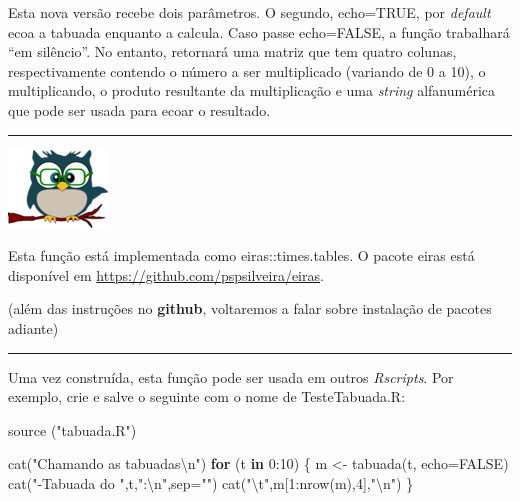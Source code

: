 \documentclass[
]{article}
\newenvironment{Shaded}{\begin{snugshade}}{\end{snugshade}}
\newcommand{\AttributeTok}[1]{\textcolor[rgb]{0.77,0.63,0.00}{#1}}
\newcommand{\ConstantTok}[1]{\textcolor[rgb]{0.00,0.00,0.00}{#1}}
\newcommand{\ControlFlowTok}[1]{\textcolor[rgb]{0.13,0.29,0.53}{\textbf{#1}}}
\newcommand{\DecValTok}[1]{\textcolor[rgb]{0.00,0.00,0.81}{#1}}
\newcommand{\FunctionTok}[1]{\textcolor[rgb]{0.00,0.00,0.00}{#1}}
\newcommand{\NormalTok}[1]{#1}
\newcommand{\OtherTok}[1]{\textcolor[rgb]{0.56,0.35,0.01}{#1}}
\newcommand{\SpecialCharTok}[1]{\textcolor[rgb]{0.00,0.00,0.00}{#1}}
\newcommand{\StringTok}[1]{\textcolor[rgb]{0.31,0.60,0.02}{#1}}
\begin{document}
Esta nova versão recebe dois parâmetros. O segundo, echo=TRUE, por
\emph{default} ecoa a tabuada enquanto a calcula. Caso passe echo=FALSE,
a função trabalhará ``em silêncio''. No entanto, retornará uma matriz
que tem quatro colunas, respectivamente contendo o número a ser
multiplicado (variando de 0 a 10), o multiplicando, o produto resultante
da multiplicação e uma \emph{string} alfanumérica que pode ser usada
para ecoar o resultado.

\begin{center}\rule{0.5\linewidth}{0.5pt}\end{center}

\begin{flushleft}\includegraphics[width=0.08\linewidth]{coruja} \end{flushleft}

Esta função está implementada como eiras::times.tables. O pacote eiras
está disponível em \url{https://github.com/pspsilveira/eiras}.

(além das instruções no \textbf{github}, voltaremos a falar sobre
instalação de pacotes adiante)

\begin{center}\rule{0.5\linewidth}{0.5pt}\end{center}

Uma vez construída, esta função pode ser usada em outros
\emph{Rscripts}. Por exemplo, crie e salve o seguinte com o nome de
TesteTabuada.R:

\begin{Shaded}
\begin{Highlighting}[]
\FunctionTok{source}\NormalTok{ (}\StringTok{"tabuada.R"}\NormalTok{)}

\FunctionTok{cat}\NormalTok{(}\StringTok{"Chamando as tabuadas}\SpecialCharTok{\textbackslash{}n}\StringTok{"}\NormalTok{)}
\ControlFlowTok{for}\NormalTok{ (t }\ControlFlowTok{in} \DecValTok{0}\SpecialCharTok{:}\DecValTok{10}\NormalTok{)}
\NormalTok{\{}
\NormalTok{  m }\OtherTok{\textless{}{-}} \FunctionTok{tabuada}\NormalTok{(t, }\AttributeTok{echo=}\ConstantTok{FALSE}\NormalTok{)}
  \FunctionTok{cat}\NormalTok{(}\StringTok{"{-}Tabuada do "}\NormalTok{,t,}\StringTok{":}\SpecialCharTok{\textbackslash{}n}\StringTok{"}\NormalTok{,}\AttributeTok{sep=}\StringTok{""}\NormalTok{)}
  \FunctionTok{cat}\NormalTok{(}\StringTok{"}\SpecialCharTok{\textbackslash{}t}\StringTok{"}\NormalTok{,m[}\DecValTok{1}\SpecialCharTok{:}\FunctionTok{nrow}\NormalTok{(m),}\DecValTok{4}\NormalTok{],}\StringTok{"}\SpecialCharTok{\textbackslash{}n}\StringTok{"}\NormalTok{)}
\NormalTok{\}}
\end{Highlighting}
\end{Shaded}
\end{document}
